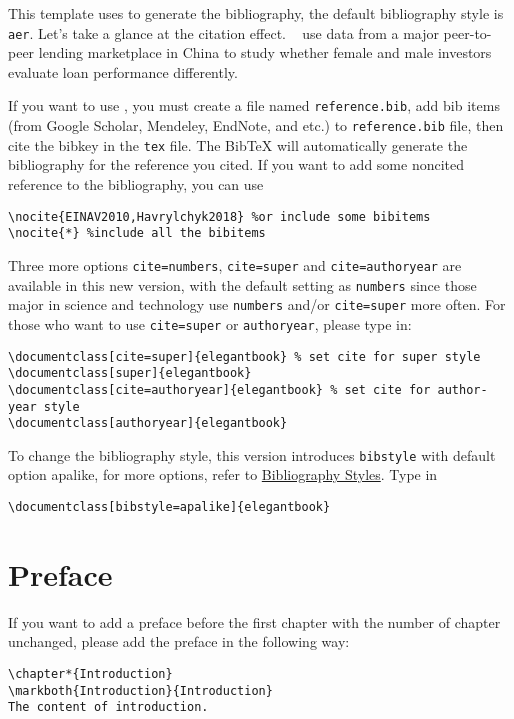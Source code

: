 \documentclass[11pt,fancy,authoryear]{elegantbook}
\begin{document}
This template uses  to generate the bibliography, the default bibliography style is \lstinline{aer}. Let's take a glance at the citation effect. ~\cite{en1} use data from a major peer-to-peer lending marketplace in China to study whether female and male investors evaluate loan performance differently. 

If you want to use , you must create a file named \lstinline{reference.bib}, add bib items (from Google Scholar, Mendeley, EndNote, and etc.) to \lstinline{reference.bib} file, then cite the bibkey in the \lstinline{tex} file. The Bib\TeX{} will automatically generate the bibliography for the reference you cited. If you want to add some noncited reference to the bibliography, you can use 
\begin{lstlisting}[frame=single]
\nocite{EINAV2010,Havrylchyk2018} %or include some bibitems
\nocite{*} %include all the bibitems
\end{lstlisting}

Three more options \lstinline{cite=numbers}, \lstinline{cite=super} and \lstinline{cite=authoryear} are available in this new version, with the default setting as \lstinline{numbers} since those major in science and technology use \lstinline{numbers} and/or \lstinline{cite=super} more often. For those who want to use \lstinline{cite=super} or \lstinline{authoryear}, please type in:
\begin{lstlisting}
\documentclass[cite=super]{elegantbook} % set cite for super style 
\documentclass[super]{elegantbook}
\documentclass[cite=authoryear]{elegantbook} % set cite for author-year style
\documentclass[authoryear]{elegantbook}
\end{lstlisting}

To change the bibliography style, this version introduces \lstinline{bibstyle} with default option apalike, for more options, refer to \href{https://www.overleaf.com/learn/latex/Bibtex_bibliography_styles}{ Bibliography Styles}. Type in
\begin{lstlisting}
\documentclass[bibstyle=apalike]{elegantbook} 
\end{lstlisting}

\section{Preface}

If you want to add a preface before the first chapter with the number of chapter unchanged, please add the preface in the following way:
\begin{lstlisting}
\chapter*{Introduction}
\markboth{Introduction}{Introduction}
The content of introduction.
\end{lstlisting}
\end{document}
